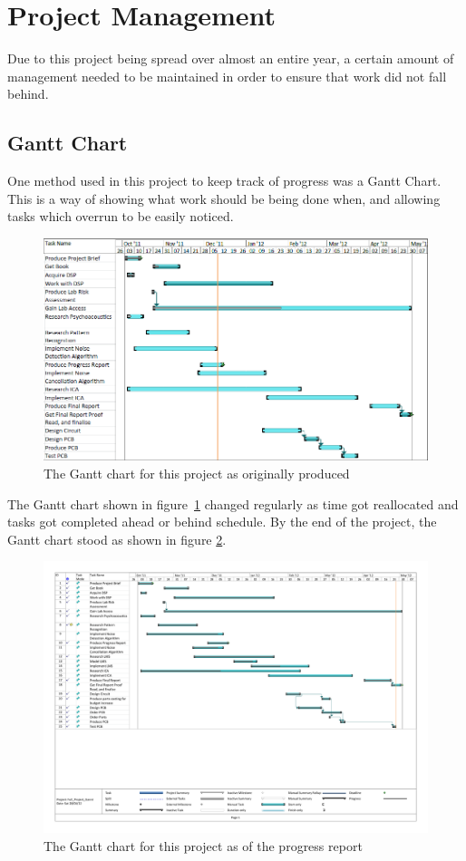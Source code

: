 \section{Project Management}
Due to this project being spread over almost an entire year, a certain amount of management needed to be maintained in order to ensure that work did not fall behind.

\subsection{Gantt Chart}
One method used in this project to keep track of progress was a Gantt Chart.
This is a way of showing what work should be being done when, and allowing tasks which overrun to be easily noticed.
\\
\begin{figure}
	\centering
	\includegraphics[width=\textwidth]{./img/ganntori.png}
	\caption{The Gantt chart for this project as originally produced}
	\label{fig:gannt}
\end{figure}

\noindent
The Gantt chart shown in figure~\ref{fig:gannt} changed regularly as time got reallocated and tasks got completed ahead or behind schedule.
By the end of the project, the Gantt chart stood as shown in figure \ref{fig:newgannt}.
\\
\begin{figure}
	\centering
	\includegraphics[width=\textwidth]{./img/Full_Project_Gannt_final.pdf}
	\caption{The Gantt chart for this project as of the progress report}
	\label{fig:newgannt}
\end{figure}

